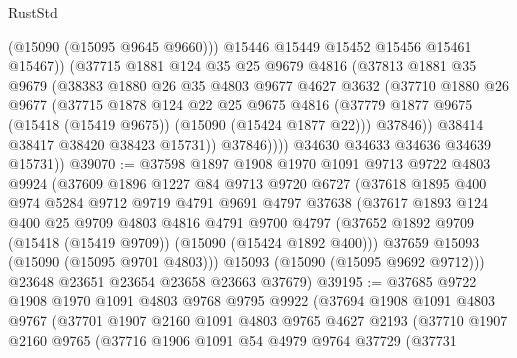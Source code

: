\begin{lexlean}{RustStd}
\begin{coremodule}
                    (@15090 (@15095 @9645 @9660)))
                  @15446
                  @15449
                  @15452
                  @15456
                  @15461
                  @15467))
              (@37715
                @1881
                @124
                @35
                @25
                @9679
                @4816
                (@37813
                  @1881
                  @35
                  @9679
                  (@38383
                    @1880
                    @26
                    @35
                    @4803
                    @9677
                    @4627
                    @3632
                    (@37710
                      @1880
                      @26
                      @9677
                      (@37715
                        @1878
                        @124
                        @22
                        @25
                        @9675
                        @4816
                        (@37779 @1877 @9675 (@15418 (@15419 @9675)) (@15090 (@15424 @1877 @22)))
                        @37846))
                    @38414
                    @38417
                    @38420
                    @38423
                    @15731))
                @37846))))
        @34630
        @34633
        @34636
        @34639
        @15731))
@39070 := @37598
    @1897
    @1908
    @1970
    @1091
    @9713
    @9722
    @4803
    @9924
    (@37609
      @1896
      @1227
      @84
      @9713
      @9720
      @6727
      (@37618
        @1895
        @400
        @974
        @5284
        @9712
        @9719
        @4791
        @9691
        @4797
        @37638
        (@37617
          @1893
          @124
          @400
          @25
          @9709
          @4803
          @4816
          @4791
          @9700
          @4797
          (@37652 @1892 @9709 (@15418 (@15419 @9709)) (@15090 (@15424 @1892 @400)))
          @37659
          @15093
          (@15090 (@15095 @9701 @4803)))
        @15093
        (@15090 (@15095 @9692 @9712)))
      @23648
      @23651
      @23654
      @23658
      @23663
      @37679)
@39195 := @37685
    @9722
    @1908
    @1970
    @1091
    @4803
    @9768
    @9795
    @9922
    (@37694
      @1908
      @1091
      @4803
      @9767
      (@37701
        @1907
        @2160
        @1091
        @4803
        @9765
        @4627
        @2193
        (@37710
          @1907
          @2160
          @9765
          (@37716
            @1906
            @1091
            @54
            @4979
            @9764
            @37729
            (@37731

\end{coremodule}
\end{lexlean}
